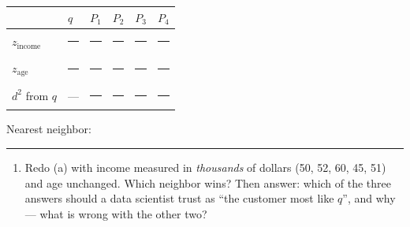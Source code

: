 \documentclass[
  11pt,
]{article}
\newcounter{none} %
\providecommand{\tightlist}{%
  \setlength{\itemsep}{0pt}\setlength{\parskip}{0pt}}
\newcommand{\answerspace}[1]{\par\vspace*{#1}}  %
\newcommand{\blank}[1][1.2in]{\rule{#1}{0.4pt}}
\begin{document}
{\def\LTcaptype{none} %
\begin{longtable}[]{@{}
  >{\centering\arraybackslash}p{}
  >{\centering\arraybackslash}p{}
  >{\centering\arraybackslash}p{}
  >{\centering\arraybackslash}p{}
  >{\centering\arraybackslash}p{}
  >{\centering\arraybackslash}p{}@{}}
\toprule\noalign{}
\begin{minipage}[b]{\linewidth}\centering
\end{minipage} & \begin{minipage}[b]{\linewidth}\centering
\(q\)
\end{minipage} & \begin{minipage}[b]{\linewidth}\centering
\(P_1\)
\end{minipage} & \begin{minipage}[b]{\linewidth}\centering
\(P_2\)
\end{minipage} & \begin{minipage}[b]{\linewidth}\centering
\(P_3\)
\end{minipage} & \begin{minipage}[b]{\linewidth}\centering
\(P_4\)
\end{minipage} \\
\midrule\noalign{}
\endhead
\bottomrule\noalign{}
\endlastfoot
\(z_{\text{income}}\) & \blank[0.7in] & \blank[0.7in] & \blank[0.7in] &
\blank[0.7in] & \blank[0.7in] \\
\(z_{\text{age}}\) & \blank[0.7in] & \blank[0.7in] & \blank[0.7in] &
\blank[0.7in] & \blank[0.7in] \\
\(d^2\) from \(q\) & --- & \blank[0.7in] & \blank[0.7in] & \blank[0.7in]
& \blank[0.7in] \\
\end{longtable}
}

Nearest neighbor: \blank[0.7in]

\answerspace{2in}

\begin{enumerate}
\def\labelenumi{(\alph{enumi})}
\setcounter{enumi}{2}
\tightlist
\item
  Redo (a) with income measured in \emph{thousands} of dollars (50, 52,
  60, 45, 51) and age unchanged. Which neighbor wins? Then answer: which
  of the three answers should a data scientist trust as ``the customer
  most like \(q\)'', and why --- what is wrong with the other two?
\end{enumerate}
\end{document}
